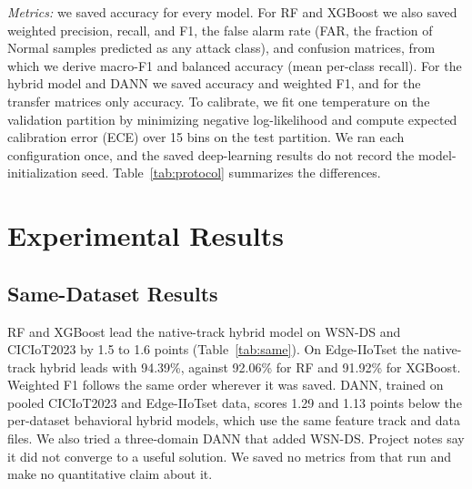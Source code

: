 \documentclass[conference]{IEEEtran}
\begin{document}
\emph{Metrics:} we saved accuracy for every model. For RF and XGBoost we also saved weighted precision, recall, and F1, the false alarm rate (FAR, the fraction of Normal samples predicted as any attack class), and confusion matrices, from which we derive macro-F1 and balanced accuracy (mean per-class recall). For the hybrid model and DANN we saved accuracy and weighted F1, and for the transfer matrices only accuracy. To calibrate, we fit one temperature on the validation partition by minimizing negative log-likelihood \cite{guo2017} and compute expected calibration error (ECE) over 15 bins on the test partition. We ran each configuration once, and the saved deep-learning results do not record the model-initialization seed. Table~\ref{tab:protocol} summarizes the differences.

\section{Experimental Results}\label{sec:results}
\subsection{Same-Dataset Results}
RF and XGBoost lead the native-track hybrid model on WSN-DS and CICIoT2023 by 1.5 to 1.6 points (Table~\ref{tab:same}). On Edge-IIoTset the native-track hybrid leads with 94.39\%, against 92.06\% for RF and 91.92\% for XGBoost. Weighted F1 follows the same order wherever it was saved. DANN, trained on pooled CICIoT2023 and Edge-IIoTset data, scores 1.29 and 1.13 points below the per-dataset behavioral hybrid models, which use the same feature track and data files. We also tried a three-domain DANN that added WSN-DS. Project notes say it did not converge to a useful solution. We saved no metrics from that run and make no quantitative claim about it.
\end{document}
